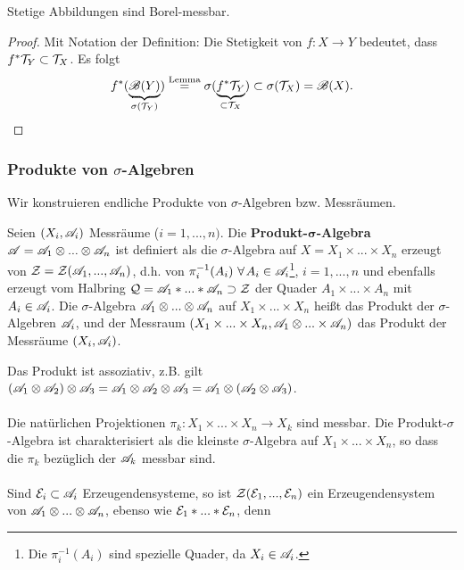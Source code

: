 \begin{lemma}
\begin{mdframed}
Stetige Abbildungen sind Borel-messbar.
\end{mdframed}
\begin{proof}
Mit Notation der Definition: Die Stetigkeit von $f:X \longrightarrow Y$ bedeutet, dass $f^* \TT_Y \subset \TT_X$. Es folgt
$$
f^*(\underbrace{\BB(Y)}_{\sigma(\TT_Y)}) \overset{\text{Lemma}}= \sigma(\underbrace{f^*\TT_Y}_{\subset \TT_X}) \subset \sigma(\TT_X) = \BB(X).
$$
\end{proof}
\end{lemma}

\subsubsection{Produkte von $\sigma$-Algebren}
Wir konstruieren endliche Produkte von $\sigma$-Algebren bzw. Messräumen. 
\begin{definition}
\begin{mdframed}
Seien $(X_i, \AA_i)$ Messräume ($i=1,...,n)$. Die \textbf{Produkt-$\boldsymbol\sigma$-Algebra} $\AA = \AA_1 \otimes ... \otimes \AA_n$ ist definiert als die $\sigma$-Algebra auf $X = X_1 \times ... \times X_n$ erzeugt von $\ZZ = \ZZ(\AA_1, ..., \AA_n)$, d.h. von $\pi_i^{-1}(A_i) \ \forall A_i \in \AA_i$\footnote{Die $\pi_i^{-1}(A_i)$ sind spezielle Quader, da $X_i \in \AA_i$.}, $i=1,...,n$ und ebenfalls erzeugt vom Halbring $\QQ = \AA_1 \ast ... \ast \AA_n \supset \ZZ$ der Quader $A_1 \times ... \times A_n$ mit $A_i \in \AA_i$.
Die $\sigma$-Algebra $\AA_1 \otimes ... \otimes \AA_n$ auf $X_1 \times ... \times X_n$ heißt das Produkt der $\sigma$-Algebren $\AA_i$, und der Messraum $(X_1\times ... \times X_n, \AA_1 \otimes ... \times \AA_n)$ das Produkt der Messräume $(X_i,\AA_i)$.
\end{mdframed}
\end{definition}
Das Produkt ist assoziativ, z.B. gilt $(\AA_1 \otimes \AA_2) \otimes \AA_3 = \AA_1 \otimes \AA_2 \otimes \AA_3 = \AA_1 \otimes (\AA_2 \otimes \AA_3)$.\Ueb \\\\
Die natürlichen Projektionen $\pi_k:X_1 \times ... \times X_n \longrightarrow X_k$ sind messbar. Die Produkt-$\sigma$-Algebra ist charakterisiert als die kleinste $\sigma$-Algebra auf $X_1 \times ... \times X_n$, so dass die $\pi_k$ bezüglich der $\AA_k$ messbar sind. \\\\
Sind $\EE_i \subset \AA_i$ Erzeugendensysteme, so ist $\ZZ(\EE_1,...,\EE_n)$ ein Erzeugendensystem von $\AA_1 \otimes ... \otimes \AA_n$, ebenso wie $\EE_1 \ast ... \ast \EE_n$, denn
